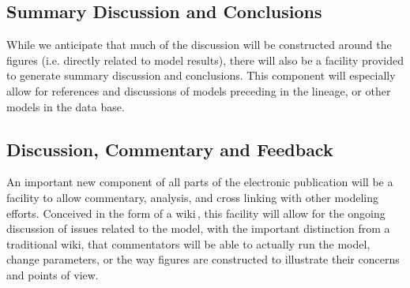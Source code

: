 \documentclass[12pt]{article}
\begin{document}
\subsection*{Summary Discussion and Conclusions}

While we anticipate that much of the discussion will be constructed around the figures (i.e. directly related to model results), there will also be a facility provided to generate summary discussion and conclusions.  This component will especially allow for references and discussions of models preceding in the lineage, or other models in the data base.  

\subsection*{Discussion, Commentary and Feedback}

An important new component of all parts of the electronic publication will be a facility to allow commentary, analysis, and cross linking with other modeling efforts.  Conceived in the form of a wiki\,\cite{Huss-3rd:2010jl}, this facility will allow for the ongoing discussion of issues related to the model, with the important distinction from a traditional wiki, that commentators will be able to actually run the model, change parameters, or the way figures are constructed to illustrate their concerns and points of view.  



\end{document}
